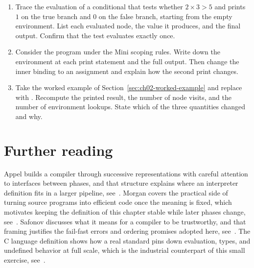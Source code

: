 \begin{enumerate}
\item \label{ex:ch02-trace-if} Trace the evaluation of a conditional that tests whether $2\times3>5$ and prints $1$ on the true branch and $0$ on the false branch, starting from the empty environment. List each evaluated node, the value it produces, and the final output. Confirm that the test evaluates exactly once.
\item \label{ex:ch02-shadow-env} Consider the program  under the Mini scoping rules. Write down the environment at each print statement and the full output. Then change the inner binding to an assignment and explain how the second print changes.
\item \label{ex:ch02-count-visits} Take the worked example of Section~\ref{sec:ch02-worked-example} and replace  with . Recompute the printed result, the number of node visits, and the number of environment lookups. State which of the three quantities changed and why.
\end{enumerate}

\section{Further reading}
\label{sec:ch02-further-reading}

Appel builds a compiler through successive representations with careful attention to interfaces between phases, and that structure explains where an interpreter definition fits in a larger pipeline, see~\cite{appel-1998-modern}.
Morgan covers the practical side of turning source programs into efficient code once the meaning is fixed, which motivates keeping the definition of this chapter stable while later phases change, see~\cite{morgan-1998-optimizing}.
Safonov discusses what it means for a compiler to be trustworthy, and that framing justifies the fail-fast errors and ordering promises adopted here, see~\cite{safonov-2010-trustworthy}.
The C language definition shows how a real standard pins down evaluation, types, and undefined behavior at full scale, which is the industrial counterpart of this small exercise, see~\cite{wg14-2011-c11}.
